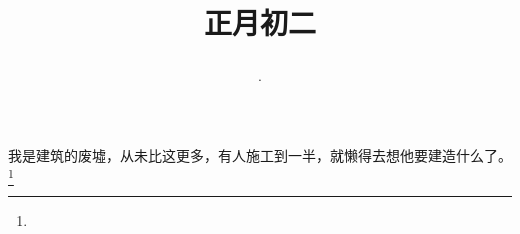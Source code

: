 \title{\date[d=11,m=2,y=2024][year:cn-y,年,month:cn,day:cn,日,·,weekday]·正月初二 }
我是建筑的废墟，从未比这更多，有人施工到一半，就懒得去想他要建造什么了。\footnote{ }

